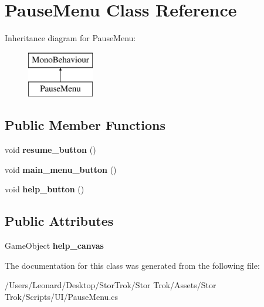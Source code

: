 \hypertarget{class_pause_menu}{}\section{Pause\+Menu Class Reference}
\label{class_pause_menu}
Inheritance diagram for Pause\+Menu\+:\begin{figure}[H]
\begin{center}
\leavevmode
\includegraphics[height=2.000000cm]{class_pause_menu}
\end{center}
\end{figure}
\subsection*{Public Member Functions}
\begin{DoxyCompactItemize}
\item 
\mbox{\label{class_pause_menu_a8e0a6e6a70f03c6791f685b09add2ba6}} 
void {\bfseries resume\+\_\+button} ()
\item 
\mbox{\label{class_pause_menu_ad9d4c966ff05ae85a5c237894009cdf6}} 
void {\bfseries main\+\_\+menu\+\_\+button} ()
\item 
\mbox{\label{class_pause_menu_ae693ab7a0e8e9a8e21be64b3ab2a82b0}} 
void {\bfseries help\+\_\+button} ()
\end{DoxyCompactItemize}
\subsection*{Public Attributes}
\begin{DoxyCompactItemize}
\item 
\mbox{\label{class_pause_menu_a7fae396a996b3af78b0891b918b7e924}} 
Game\+Object {\bfseries help\+\_\+canvas}
\end{DoxyCompactItemize}


The documentation for this class was generated from the following file\+:\begin{DoxyCompactItemize}
\item 
/\+Users/\+Leonard/\+Desktop/\+Stor\+Trok/\+Stor Trok/\+Assets/\+Stor Trok/\+Scripts/\+U\+I/Pause\+Menu.\+cs\end{DoxyCompactItemize}
